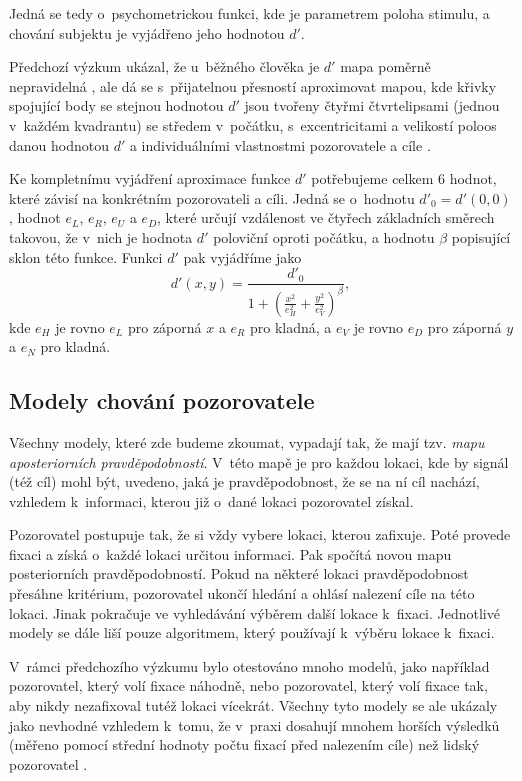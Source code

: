 Jedná se tedy o~psychometrickou funkci, kde je parametrem poloha stimulu, a chování subjektu je vyjádřeno jeho hodnotou
$d'$.

Předchozí výzkum ukázal, že u~běžného člověka je $d'$ mapa poměrně
nepravidelná \citep{Najemnik08}, ale dá se s~přijatelnou přesností aproximovat mapou, kde křivky
spojující body se stejnou hodnotou $d'$ jsou tvořeny čtyřmi čtvrt\-elipsami
(jednou v~každém kvadrantu) se středem v~počátku,
s~excentricitami a velikostí poloos danou hodnotou $d'$ a individuálními
vlastnostmi pozorovatele a cíle \citep{Ellipse}. 

Ke kompletnímu vyjádření aproximace funkce $d'$ potřebujeme celkem 6 hodnot,
které závisí na konkrétním pozorovateli a cíli. Jedná se o~hodnotu $d'_0 =
d'(0,0)$, hodnot $e_L$, $e_R$, $e_U$ a $e_D$, které určují vzdálenost ve čtyřech
základních směrech takovou, že v~nich je hodnota $d'$ poloviční oproti počátku,
a hodnotu $\beta$ popisující sklon této funkce. Funkci $d'$ pak vyjádříme jako
$$ d'(x,y) = \frac{d'_0}{1+\left(\frac{x^2}{e_H^2}+\frac{y^2}{e_V^2}
\right)^\beta}, $$ kde $e_H$ je rovno $e_L$ pro záporná $x$ a $e_R$ pro kladná,
a $e_V$ je rovno $e_D$ pro záporná $y$ a $e_N$ pro kladná.


\subsection{Modely chování pozorovatele}

Všechny modely, které zde budeme zkoumat, vypadají tak, že mají tzv. {\it mapu
aposteriorních pravděpodobností}. V~této mapě je pro každou lokaci, kde by
signál (též cíl) mohl být, uvedeno, jaká je pravděpodobnost, že se na ní cíl
nachází, vzhledem k~informaci, kterou již o~dané lokaci pozorovatel získal. 

Pozorovatel postupuje tak, že si vždy vybere lokaci, kterou zafixuje. Poté
provede fixaci a získá o~každé lokaci určitou informaci. Pak spočítá novou mapu
posteriorních pravděpodobností. Pokud na některé lokaci pravděpodobnost přesáhne kritérium, pozorovatel
ukončí hledání a ohlásí nalezení cíle na této lokaci. Jinak pokračuje ve vyhledávání výběrem další lokace k~fixaci.
Jednotlivé modely se dále liší pouze algoritmem, který používají k~výběru lokace k~fixaci.


V~rámci předchozího výzkumu bylo otestováno mnoho modelů, jako například
pozorovatel, který volí fixace náhodně, nebo pozorovatel, který volí fixace 
tak, aby nikdy nezafixoval tutéž lokaci vícekrát. Všechny tyto modely se ale ukázaly jako
nevhodné vzhledem k~tomu, že v~praxi dosahují mnohem horších výsledků (měřeno
pomocí střední hodnoty počtu fixací před nalezením cíle) než lidský
pozorovatel \citep{Najemnik05}.

